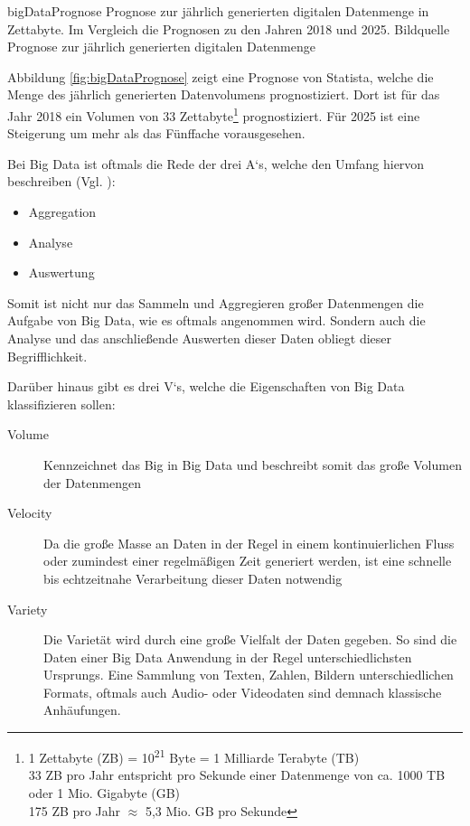 \bildbreit
{bigDataPrognose}
{Prognose zur jährlich generierten digitalen Datenmenge in Zettabyte. Im Vergleich die Prognosen zu den Jahren 2018 und 2025. Bildquelle \cite[S.6]{Reinsel.November2018}}
{Prognose zur jährlich generierten digitalen Datenmenge}

Abbildung \ref{fig:bigDataPrognose} zeigt eine Prognose von Statista, welche die Menge des jährlich generierten Datenvolumens prognostiziert.
Dort ist für das Jahr 2018 ein Volumen von 33 Zettabyte\footnote{ 1 Zettabyte (ZB) = 10\textsuperscript{21} Byte = 1 Milliarde Terabyte (TB) \\
33 ZB pro Jahr entspricht pro Sekunde einer Datenmenge von ca. 1000 TB oder 1 Mio. Gigabyte (GB) \\
175 ZB pro Jahr $\approx$ 5,3 Mio. GB pro Sekunde} prognostiziert.
Für 2025 ist eine Steigerung um mehr als das Fünffache vorausgesehen.

Bei Big Data ist oftmals die Rede der drei A`s, welche den Umfang hiervon beschreiben (Vgl. \cite[2.1]{Hausler.2018}):
\begin{itemize}
\item Aggregation
\item Analyse
\item Auswertung
\end{itemize}
Somit ist nicht nur das Sammeln und Aggregieren großer Datenmengen die Aufgabe von Big Data, wie es oftmals angenommen wird.
Sondern auch die Analyse und das anschließende Auswerten dieser Daten obliegt dieser Begrifflichkeit.


Darüber hinaus gibt es drei V`s, welche die Eigenschaften von Big Data klassifizieren sollen:
\begin{description}
\item[Volume] Kennzeichnet das \glqq Big\grqq{} in Big Data und beschreibt somit das große Volumen der Datenmengen
\item[Velocity] Da die große Masse an Daten in der Regel in einem kontinuierlichen Fluss oder zumindest einer regelmäßigen Zeit generiert werden, ist eine schnelle bis echtzeitnahe Verarbeitung dieser Daten notwendig 
\item[Variety] Die Varietät wird durch eine große Vielfalt der Daten gegeben.
So sind die Daten einer Big Data Anwendung in der Regel unterschiedlichsten Ursprungs. 
Eine Sammlung von Texten, Zahlen, Bildern unterschiedlichen Formats, oftmals auch Audio- oder Videodaten sind demnach klassische Anhäufungen. 
\end{description}


